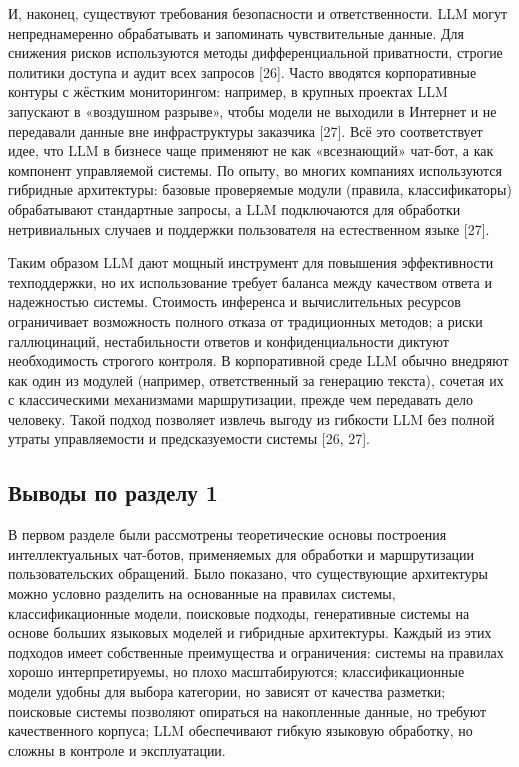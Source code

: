 \documentclass[14pt,a4paper]{extarticle}
\numberwithin{figure}{section}
\numberwithin{table}{section}
\begin{document}
И, наконец, существуют требования безопасности и ответственности. LLM
могут непреднамеренно обрабатывать и запоминать чувствительные данные.
Для снижения рисков используются методы дифференциальной приватности,
строгие политики доступа и аудит всех запросов [26]. Часто вводятся
корпоративные контуры с жёстким мониторингом: например, в крупных
проектах LLM запускают в «воздушном разрыве», чтобы модели не выходили в
Интернет и не передавали данные вне инфраструктуры заказчика [27].
Всё это соответствует идее, что LLM в бизнесе чаще применяют
не как «всезнающий» чат-бот, а как компонент управляемой системы. По
опыту, во многих компаниях используются гибридные архитектуры: базовые
проверяемые модули (правила, классификаторы) обрабатывают стандартные
запросы, а LLM подключаются для обработки нетривиальных случаев и
поддержки пользователя на естественном языке [27].

Таким образом LLM дают мощный инструмент для повышения эффективности
техподдержки, но их использование требует баланса между качеством ответа
и надежностью системы. Стоимость инференса и вычислительных ресурсов
ограничивает возможность полного отказа от традиционных методов; а риски
галлюцинаций, нестабильности ответов и конфиденциальности диктуют
необходимость строгого контроля. В корпоративной среде LLM обычно
внедряют как один из модулей (например, ответственный за генерацию
текста), сочетая их с классическими механизмами маршрутизации, прежде
чем передавать дело человеку. Такой подход позволяет извлечь выгоду из
гибкости LLM без полной утраты управляемости и предсказуемости
системы [26, 27].

\subsection{Выводы по разделу
1}

В первом разделе были рассмотрены теоретические основы построения
интеллектуальных чат-ботов, применяемых для обработки и маршрутизации
пользовательских обращений. Было показано, что существующие архитектуры
можно условно разделить на основанные на правилах системы, классификационные модели,
поисковые подходы, генеративные системы на основе больших языковых
моделей и гибридные архитектуры. Каждый из этих подходов имеет
собственные преимущества и ограничения: системы на правилах хорошо
интерпретируемы, но плохо масштабируются; классификационные модели
удобны для выбора категории, но зависят от качества разметки;
поисковые системы позволяют опираться на накопленные данные, но
требуют качественного корпуса; LLM обеспечивают гибкую языковую
обработку, но сложны в контроле и эксплуатации.
\end{document}

